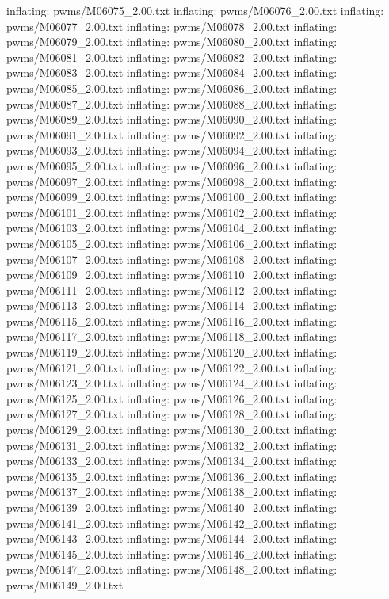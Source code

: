 \documentclass[letterpaper,10pt,english]{sphinxmanual}
\begin{document}
{\begin{sphinxVerbatim}[commandchars=\\\{\}]
  inflating: pwms/M06075\_2.00.txt
  inflating: pwms/M06076\_2.00.txt
  inflating: pwms/M06077\_2.00.txt
  inflating: pwms/M06078\_2.00.txt
  inflating: pwms/M06079\_2.00.txt
  inflating: pwms/M06080\_2.00.txt
  inflating: pwms/M06081\_2.00.txt
  inflating: pwms/M06082\_2.00.txt
  inflating: pwms/M06083\_2.00.txt
  inflating: pwms/M06084\_2.00.txt
  inflating: pwms/M06085\_2.00.txt
  inflating: pwms/M06086\_2.00.txt
  inflating: pwms/M06087\_2.00.txt
  inflating: pwms/M06088\_2.00.txt
  inflating: pwms/M06089\_2.00.txt
  inflating: pwms/M06090\_2.00.txt
  inflating: pwms/M06091\_2.00.txt
  inflating: pwms/M06092\_2.00.txt
  inflating: pwms/M06093\_2.00.txt
  inflating: pwms/M06094\_2.00.txt
  inflating: pwms/M06095\_2.00.txt
  inflating: pwms/M06096\_2.00.txt
  inflating: pwms/M06097\_2.00.txt
  inflating: pwms/M06098\_2.00.txt
  inflating: pwms/M06099\_2.00.txt
  inflating: pwms/M06100\_2.00.txt
  inflating: pwms/M06101\_2.00.txt
  inflating: pwms/M06102\_2.00.txt
  inflating: pwms/M06103\_2.00.txt
  inflating: pwms/M06104\_2.00.txt
  inflating: pwms/M06105\_2.00.txt
  inflating: pwms/M06106\_2.00.txt
  inflating: pwms/M06107\_2.00.txt
  inflating: pwms/M06108\_2.00.txt
  inflating: pwms/M06109\_2.00.txt
  inflating: pwms/M06110\_2.00.txt
  inflating: pwms/M06111\_2.00.txt
  inflating: pwms/M06112\_2.00.txt
  inflating: pwms/M06113\_2.00.txt
  inflating: pwms/M06114\_2.00.txt
  inflating: pwms/M06115\_2.00.txt
  inflating: pwms/M06116\_2.00.txt
  inflating: pwms/M06117\_2.00.txt
  inflating: pwms/M06118\_2.00.txt
  inflating: pwms/M06119\_2.00.txt
  inflating: pwms/M06120\_2.00.txt
  inflating: pwms/M06121\_2.00.txt
  inflating: pwms/M06122\_2.00.txt
  inflating: pwms/M06123\_2.00.txt
  inflating: pwms/M06124\_2.00.txt
  inflating: pwms/M06125\_2.00.txt
  inflating: pwms/M06126\_2.00.txt
  inflating: pwms/M06127\_2.00.txt
  inflating: pwms/M06128\_2.00.txt
  inflating: pwms/M06129\_2.00.txt
  inflating: pwms/M06130\_2.00.txt
  inflating: pwms/M06131\_2.00.txt
  inflating: pwms/M06132\_2.00.txt
  inflating: pwms/M06133\_2.00.txt
  inflating: pwms/M06134\_2.00.txt
  inflating: pwms/M06135\_2.00.txt
  inflating: pwms/M06136\_2.00.txt
  inflating: pwms/M06137\_2.00.txt
  inflating: pwms/M06138\_2.00.txt
  inflating: pwms/M06139\_2.00.txt
  inflating: pwms/M06140\_2.00.txt
  inflating: pwms/M06141\_2.00.txt
  inflating: pwms/M06142\_2.00.txt
  inflating: pwms/M06143\_2.00.txt
  inflating: pwms/M06144\_2.00.txt
  inflating: pwms/M06145\_2.00.txt
  inflating: pwms/M06146\_2.00.txt
  inflating: pwms/M06147\_2.00.txt
  inflating: pwms/M06148\_2.00.txt
  inflating: pwms/M06149\_2.00.txt

\end{sphinxVerbatim}}
\end{document}
